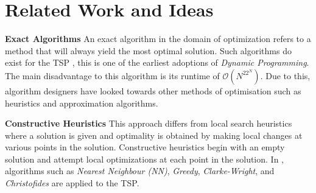 \documentclass[]{UCD_CS_FYP_Report}
\begin{document}
\chapter{Related Work and Ideas}
\textbf{Exact Algorithms}
An exact algorithm in the domain of optimization refers to a method that will always yield the most optimal solution. Such algorithms do exist for the TSP \cite{Bellman:1962:DPT:321105.321111}, this is one of the earliest adoptions of \textit{Dynamic Programming}. The main disadvantage to this algorithm is its runtime of $\mathcal{O}(N^22^N)$. Due to this, algorithm designers have looked towards other methods of optimisation such as heuristics and approximation algorithms.

\textbf{Constructive Heuristics}
This approach differs from local search heuristics where a solution is given and optimality is obtained by making local changes at various points in the solution. Constructive heuristics begin with an empty solution and attempt local optimizations at each point in the solution. In \cite{JohnMcGe97}, algorithms such as \textit{Nearest Neighbour (NN)}, \textit{Greedy}, \textit{Clarke-Wright}, and
\textit{Christofides} are applied to the TSP. 
\end{document}
